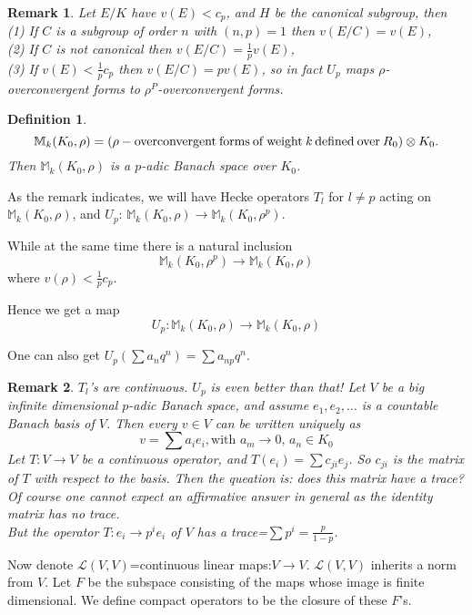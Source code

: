 \documentclass{article}%
\newtheorem{rmk}{Remark}
\newtheorem{Def}[theorem]{Definition}
\begin{document}
\begin{rmk}
Let $E/K$ have $v(E)<c_p$, and $H$ be the canonical subgroup, then\\
(1) If $C$ is a subgroup of order $n$ with $(n,p)=1$ then $v(E/C)=v(E)$,\\
(2) If $C$ is not canonical then $v(E/C)=\frac1pv(E)$,\\
(3) If $v(E)<\frac1pc_p$ then $v(E/C)=pv(E)$, so in fact $U_p$ maps
$\rho$-overconvergent forms to $\rho^P$-overconvergent forms.
\end{rmk}
\begin{Def}
$$\mathbb{M}_k(K_0,\rho)=(\rho-{\rm overconvergent\: forms\: of\: weight\:
{\it k}\: defined\: over\:} R_0)\otimes K_0.$$ Then $\mathbb{M}_k(K_0,\rho)$
is a $p$-adic Banach space over $K_0$.
\end{Def}

As the remark indicates, we will have Hecke operators $T_l$ for $l\neq p$
acting on $\mathbb{M}_k(K_0,\rho)$, and $U_p$:
$\mathbb{M}_k(K_0,\rho)\to\mathbb{M}_k(K_0,\rho^p)$.

While at the same time there is a natural inclusion
$$\mathbb{M}_k(K_0,\rho^p)\longrightarrow\mathbb{M}_k(K_0,\rho)$$
where $v(\rho)<\frac1pc_p$.


Hence we get a map 
$$U_p:\mathbb{M}_k(K_0,\rho)\longrightarrow\mathbb{M}_k(K_0,\rho)$$


One can also get $U_p(\sum a_nq^n)=\sum a_{np}q^n$.



\begin{rmk}
$T_l$'s are continuous. $U_p$ is even better than that! Let $V$ be a big
infinite
dimensional $p$-adic Banach space, and assume $e_1,e_2,\ldots$ is a
countable Banach basis
of $V$. Then every $v\in V$ can be  written uniquely as 
$$v=\sum a_ie_i,\text{with $a_m\to0$, $a_n\in K_0$}$$
Let $T:V\to V$ be a continuous operator, and $T(e_i)=\sum c_{ji}e_j$. So
$c_{ji}$ is
the matrix of $T$ with respect to the basis. Then the queation is: does this
matrix have
a trace? Of course one cannot expect an affirmative answer in general as the
identity
matrix has no trace.\\
But the operator $T:e_i\to p^ie_i$ of $V$ has a trace=$\sum
p^i=\frac{p}{1-p}$.
\end{rmk}

Now denote $\mathcal{L}(V,V)$=continuous linear maps:$V\to V$.
$\mathcal{L}(V,V)$ inherits a norm from $V$. Let $F$ be the subspace
consisting of the maps whose image is finite dimensional. We define compact
operators to be the closure of these $F$'s.
\end{document}
